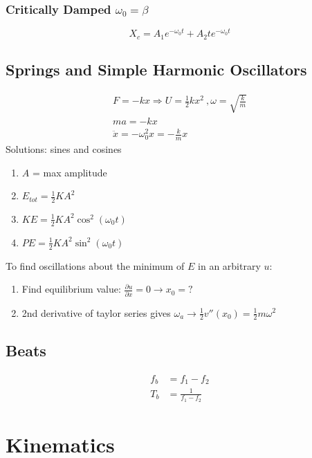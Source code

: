 \documentclass[10pt,a4paper]{article}
\begin{document}
\subsubsection{Critically Damped $\omega_0 = \beta$}
\begin{equation}
 X_c = A_1 e^{-\omega_0 t} + A_2t e^{-\omega_0 t} 
\end{equation}

\subsection{Springs and Simple Harmonic Oscillators}
\begin{align}
 F=-kx \Rightarrow U = \frac{1}{2}kx^2~, \omega=\sqrt{\frac{k}{m}}\\
 ma = -kx\\
 \ddot{x} = -\omega_0^2 x = -\frac{k}{m}x
\end{align}
Solutions: sines and cosines
\begin{enumerate}
 \item $A$ = max amplitude
 \item $E_{tot} = \frac{1}{2}KA^2$
 \item $KE = \frac{1}{2}KA^2 \cos^2(\omega_0t)$
 \item $PE = \frac{1}{2}KA^2 \sin^2(\omega_0t)$
\end{enumerate}
To find oscillations about the minimum of $E$ in an arbitrary $u$:
\begin{enumerate}
    \item Find equilibrium value: $\frac{\partial u}{\partial x} = 0 \rightarrow x_0 = ?$
    \item 2nd derivative of taylor series gives $\omega_a \rightarrow \frac{1}{2} v'' (x_0) = \frac{1}{2}m\omega^2$
\end{enumerate}

\subsection{Beats}
\begin{align}
 f_b &= f_1 - f_2\\
 T_b &= \frac{1}{f_1 - f_2}
\end{align}


\section{Kinematics}
\end{document}
